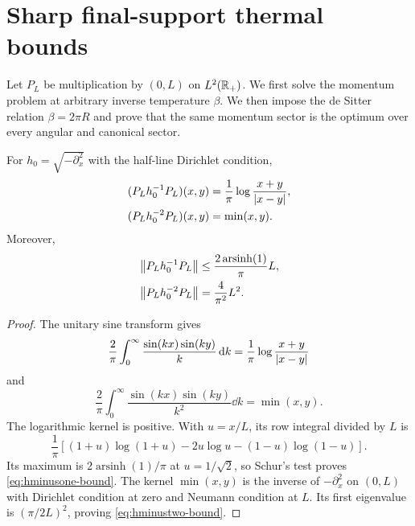 \section{Sharp final-support thermal bounds}
\label{sec:bound}

Let $P_L$ be multiplication by $(0,L)$ on $L^2(\mathbb R_+)$.  We first solve the
momentum problem at arbitrary inverse temperature $\beta$.  We then impose the
de Sitter relation $\beta=2\pi R$ and prove that the same momentum sector is
the optimum over every angular and canonical sector.

\begin{lemma}
\label{lem:compressed-inverses}
For $h_0=\sqrt{-\partial_x^2}$ with the half-line Dirichlet condition,
\begin{align}
 (P_Lh_0^{-1}P_L)(x,y)
 &=\frac1\pi\log\frac{x+y}{\left\lvert x-y\right\rvert},
 \label{eq:hminusone-kernel}\\
 (P_Lh_0^{-2}P_L)(x,y)
 &=\min(x,y).
 \label{eq:hminustwo-kernel}
\end{align}
Moreover,
\begin{align}
 \left\lVert P_Lh_0^{-1}P_L\right\rVert
 &\leq \frac{2\operatorname{arsinh}(1)}{\pi}L,
 \label{eq:hminusone-bound}\\
 \left\lVert P_Lh_0^{-2}P_L\right\rVert
 &=\frac{4}{\pi^2}L^2.
 \label{eq:hminustwo-bound}
\end{align}
\end{lemma}

\begin{proof}
The unitary sine transform gives
\[
 \frac2\pi\int_0^\infty\frac{\sin(kx)\sin(ky)}{k}\,\mathrm d k
 =\frac1\pi\log\frac{x+y}{\left\lvert x-y\right\rvert}
\]
and
\[
 \frac2\pi\int_0^\infty\frac{\sin(kx)\sin(ky)}{k^2}\dd k
 =\min(x,y).
\]
The logarithmic kernel is positive.  With $u=x/L$, its row integral divided by
$L$ is
\begin{equation}
 \frac1\pi\left[(1+u)\log(1+u)-2u\log u
 -(1-u)\log(1-u)\right].
 \label{eq:row-integral}
\end{equation}
Its maximum is $2\operatorname{arsinh}(1)/\pi$ at $u=1/\sqrt2$, so Schur's
test proves \cref{eq:hminusone-bound}.  The kernel $\min(x,y)$ is the inverse
of $-\partial_x^2$ on $(0,L)$ with Dirichlet condition at zero and Neumann
condition at $L$.  Its first eigenvalue is $(\pi/2L)^2$, proving
\cref{eq:hminustwo-bound}.
\end{proof}

